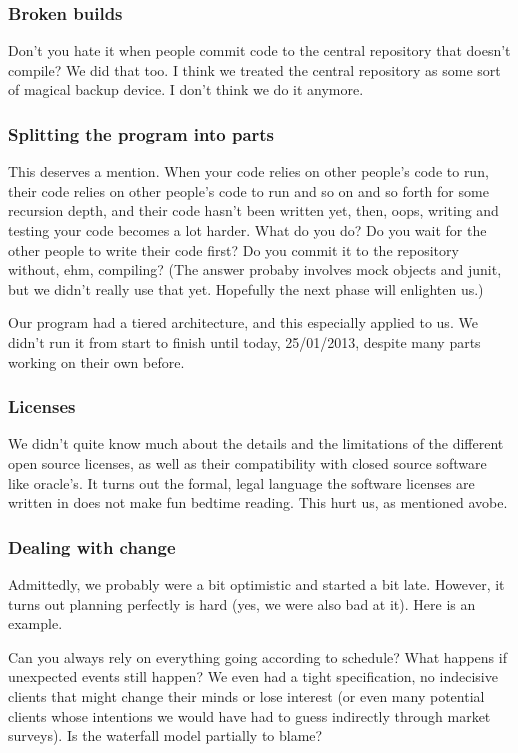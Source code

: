 \subsubsection{Broken builds}
    Don't you hate it when people commit code to the central repository that doesn't compile?
    We did that too. I think we treated the central repository as some sort of magical backup device.
    I don't think we do it anymore.
    
\subsubsection{Splitting the program into parts}
    This deserves a mention. When your code relies on other people's code to run, their code relies on other people's code to run and so on and so forth for some recursion depth, and their code hasn't been written yet, then, oops,
    writing and testing your code becomes a lot harder. What do you do? Do you wait for the other people to write their code first? Do you commit it to the repository without, ehm, compiling?
    (The answer probaby involves mock objects and junit, but we didn't really use that yet. Hopefully the next phase will enlighten us.)
     
    Our program had a tiered architecture, and this especially applied to us. 
    We didn't run it from start to finish until today, 25/01/2013, despite many parts working on their own before.

\subsubsection{Licenses}
    We didn't quite know much about the details and the limitations of the different open source licenses,
    as well as their compatibility with closed source software like oracle's.
    It turns out the formal, legal language the software licenses are written in does not make fun bedtime reading.
    This hurt us, as mentioned avobe.

\subsubsection{Dealing with change}
    Admittedly, we probably were a bit optimistic and started a bit late. However, it turns out planning perfectly is hard (yes, we were also bad at it). Here is an example.
    
    Can you always rely on everything going according to schedule? What happens if unexpected events still happen? We even had a tight specification,
    no indecisive clients that might change their minds or lose interest (or even many potential clients whose intentions we would have had to guess indirectly through market surveys).
    Is the waterfall model partially to blame?
    

